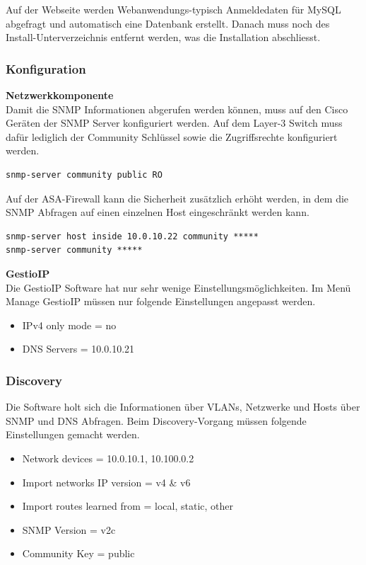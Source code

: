 \documentclass[11pt,a4paper,parskip=half]{scrartcl}
\begin{document}
Auf der Webseite werden Webanwendungs-typisch Anmeldedaten für MySQL abgefragt und automatisch eine Datenbank erstellt. Danach muss noch des Install-Unterverzeichnis entfernt werden, was die Installation abschliesst.


\subsubsection{Konfiguration}
\textbf{Netzwerkkomponente}\\
Damit die SNMP Informationen abgerufen werden können, muss auf den Cisco Geräten der SNMP Server konfiguriert werden. Auf dem Layer-3 Switch muss dafür lediglich der Community Schlüssel sowie die Zugriffsrechte konfiguriert werden.
\begin{lstlisting}
snmp-server community public RO
\end{lstlisting}
Auf der ASA-Firewall kann die Sicherheit zusätzlich erhöht werden, in dem die SNMP Abfragen auf einen einzelnen Host eingeschränkt werden kann. 
\begin{lstlisting}
snmp-server host inside 10.0.10.22 community *****
snmp-server community *****
\end{lstlisting}
\textbf{GestioIP}\\
Die GestioIP Software hat nur sehr wenige Einstellungsmöglichkeiten. Im Menü \glqq{}Manage GestioIP\grqq{} müssen nur folgende Einstellungen angepasst werden.
\begin{itemize}
\item{IPv4 only mode = no}
\item{DNS Servers = 10.0.10.21}
\end{itemize}

\subsubsection{Discovery}
Die Software holt sich die Informationen über VLANs, Netzwerke und Hosts über SNMP und DNS Abfragen. Beim Discovery-Vorgang müssen folgende Einstellungen gemacht werden.
\begin{itemize}
\item{Network devices = 10.0.10.1, 10.100.0.2}
\item{Import networks IP version = v4 \& v6}
\item{Import routes learned from = local, static, other}
\item{SNMP Version = v2c}
\item{Community Key = public}
\end{itemize}
\end{document}
